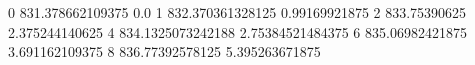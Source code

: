 0 831.378662109375 0.0
1 832.370361328125 0.99169921875
2 833.75390625 2.375244140625
4 834.1325073242188 2.75384521484375
6 835.06982421875 3.691162109375
8 836.77392578125 5.395263671875
